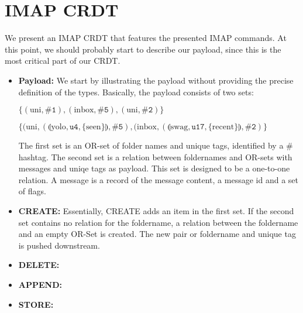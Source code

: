 \documentclass[a4paper]{scrartcl}
\begin{document}
\section{IMAP CRDT}

We present an IMAP CRDT that features the presented IMAP commands. At this point,
we should probably start to describe our payload, since this is the most critical
part of our CRDT.

\begin{itemize}
  \item \textbf{Payload:} We start by illustrating the payload without providing
  the precise definition of the types. Basically, the payload consists of two
  sets:

  $\{(\text{uni},\texttt{\#1}), (\text{inbox},\texttt{\#5}), (\text{uni},\texttt{\#2})\}$

  $\{(\text{uni},(\llparenthesis \text{yolo}, \texttt{u4}, \{\text{seen}\} \rrparenthesis,\texttt{\#5}),
  (\text{inbox},(\llparenthesis \text{swag}, \texttt{u17}, \{\text{recent}\} \rrparenthesis,\texttt{\#2})\}$

  The first set is an OR-set of folder names and unique tags, identified by a $\#$hashtag.
  The second set is a relation between foldernames and OR-sets with messages and uniqe tags as payload.
  This set is designed to be a one-to-one relation. A message is a record of the message content, a message id and
  a set of flags.

  \item \textbf{CREATE:} Essentially, CREATE adds an item in the first set. If the second set contains
  no relation for the foldername, a relation between the foldername and an empty OR-Set is created.
  The new pair or foldername and unique tag is pushed downstream.
  \item \textbf{DELETE:}
  \item \textbf{APPEND:}
  \item \textbf{STORE:}

\end{itemize}


\printbibliography
\end{document}
